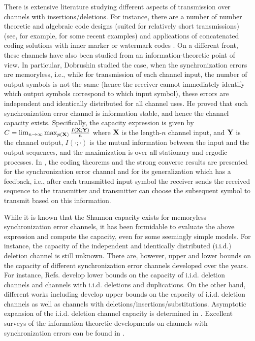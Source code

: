 \documentclass[journal, twocol]{IEEEtran}
\begin{document}
There is extensive literature studying different aspects of transmission over channels with insertions/deletions. For instance, there are a number of number theoretic and algebraic code designs (suited for relatively short transmissions) (see, for example, \cite{Sima2021,Song2022,Song2023} for some recent examples) and applications of concatenated coding solutions with inner marker or watermark codes \cite{Ratzer2000,Davey2001,Wang2011}. On a different front, these channels have also been studied from an information-theoretic point of view. 
In particular, Dobrushin \cite{dobrushin67shannons} studied the case, when the synchronization errors are memoryless, i.e., while for transmission of each channel input, the number of output symbols is not the same (hence the receiver cannot immediately identify which output symbols correspond to which input symbol), these errors are independent and identically distributed for all channel uses.
He proved that such synchronization error channel is information stable, and hence the channel capacity exists. Specifically, the capacity expression is given by $C = \mathop{\lim}_{n \rightarrow \infty} \mathop{\max}_{p(\bf{X})} \frac{I(\bf{X};\bf{Y})}{n}$ where $\bf{X}$ is the length-$n$ channel input, and $\bf{Y}$ is the channel output, $I(\cdot;\cdot)$ is the mutual information between the input and the output sequences, and the maximization is over all stationary and ergodic processes.
In \cite{ahlswede71channels}, the coding theorems and the strong converse results are presented for the synchronization error channel and for its generalization which has a feedback, i.e., after each transmitted input symbol the receiver sends the received sequence to the transmitter and transmitter can choose the subsequent symbol to transmit based on this information.

While it is known that the Shannon capacity exists for memoryless synchronization error channels, it has been formidable to evaluate the above expression and compute the capacity, even for some seemingly simple models. 
For instance, the capacity of the independent and identically distributed (i.i.d.) deletion channel is still unknown.
There are, however, upper and lower bounds on the capacity of different synchronization error channels developed over the years.
For instance, Refs. \cite{drinea06lower, Mitzenmacher2006, Driena2007} develop lower bounds on the capacity of i.i.d. deletion channels and channels with i.i.d. deletions and duplications. 
On the other hand, different works including \cite{Diggavi2007,fertonani10novel,rahmati15upper} develop upper bounds on the capacity of i.i.d. deletion channels as well as channels with deletions/insertions/substitutions. 
Asymptotic expansion of the i.i.d. deletion channel capacity is determined in \cite{kanoria13optimal,kalai10tight}. 
Excellent surveys of the information-theoretic developments on channels with synchronization errors can be found in \cite{mitzenmacher09survey,cheraghchi21overview}.
\end{document}
